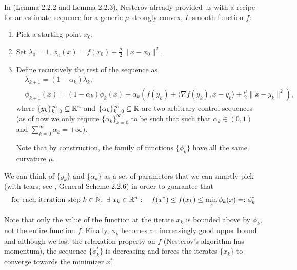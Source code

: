 \documentclass{article}
\begin{document}
In \cite{Nesterov1998} (Lemma 2.2.2 and Lemma 2.2.3), Nesterov already provided us with a recipe for an estimate sequence for a generic $\mu$-strongly convex, $L$-smooth function $f$: 
\begin{enumerate}
\item Pick a starting point $x_0$;
\item Set  $\lambda_0 = 1$, $\phi_0{(x)} = f(x_0) + \frac{\mu}{2}\|{x - x_0}\|^2$.
\item Define recursively the rest of the sequence as
\begin{align}
& \lambda_{k+1} = (1-\alpha_k)\lambda_k, \\
& \phi_{k+1}(x) = (1-\alpha_k)\phi_k(x) + \alpha_k\left( f(y_k) + \langle\nabla f(y_k), x-y_k\rangle + \frac{\mu}{2}\lVert{x - y_k}\rVert^2\right ) ,
\end{align}
where $\{y_k\}_{k=0}^{\infty} \subseteq \mathbb{R}^n$ and  $\{\alpha_k\}_{k=0}^{\infty} \subseteq \mathbb{R}$ are two arbitrary control sequences (as of now we only require $\{\alpha_k\}_{k=0}^{\infty}$ to be such that such that $\alpha_k \in (0, 1)$ and $\sum_{k=0}^\infty{\alpha_k} = +\infty$). 

Note that by construction, the family of functions $\{\phi_k\}$ have all the same curvature $\mu$.
\end{enumerate}



We can think of $\{y_k\}$ and $\{\alpha_k\}$ as a set of parameters that we can smartly pick (with tears; see \cite{Nesterov1998}, General Scheme 2.2.6) in order to guarantee that 
\begin{gather}
\text{for each iteration step } k \in \mathbb{N}, \ \exists \ x_k \in \mathbb{R}^n: \quad f(x^\ast) \leq f(x_k) \leq  \min\limits_{x} \phi_k (x) =: \phi_k^\ast\label{eq11}
\end{gather}

Note that only the value of the function at the iterate $x_k$ is bounded above by $\phi_k$, not the entire function $f$. 
Finally, $\phi_k$ becomes an increasingly good upper bound and although we lost the relaxation property on $f$ (Nesterov's algorithm has momentum), the sequence $\{\phi_k^\ast\}$ is decreasing and forces the iterates $\{x_k\}$ to converge towards the minimizer $x^\ast$.
\end{document}

